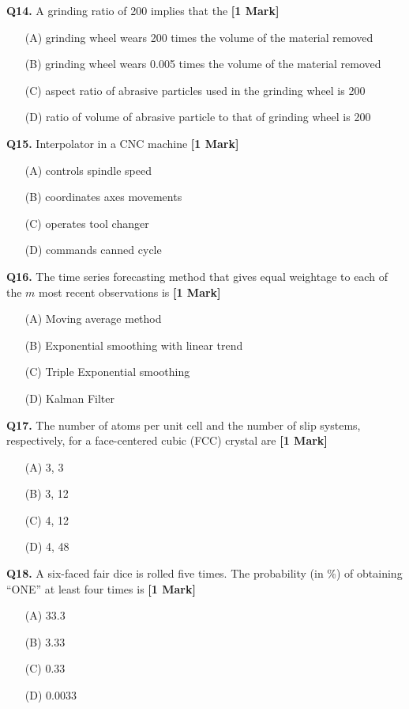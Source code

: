 \documentclass[11pt]{article}
\newcommand{\questiona}[2]{
    \noindent\textbf{Q#2.} #1 \hfill \textbf{[1 Mark]}
}
\begin{document}
\questiona{A grinding ratio of 200 implies that the}{14}
\begin{enumerate}
    \item[(A)] grinding wheel wears 200 times the volume of the material removed
    \item[(B)] grinding wheel wears 0.005 times the volume of the material removed
    \item[(C)] aspect ratio of abrasive particles used in the grinding wheel is 200
    \item[(D)] ratio of volume of abrasive particle to that of grinding wheel is 200
\end{enumerate}
\vspace{0.5cm}

\questiona{Interpolator in a CNC machine}{15}
\begin{enumerate}
    \item[(A)] controls spindle speed
    \item[(B)] coordinates axes movements
    \item[(C)] operates tool changer
    \item[(D)] commands canned cycle
\end{enumerate}
\vspace{0.5cm}

\questiona{The time series forecasting method that gives equal weightage to each of the \( m \) most recent observations is}{16}
\begin{enumerate}
    \item[(A)] Moving average method
    \item[(B)] Exponential smoothing with linear trend
    \item[(C)] Triple Exponential smoothing
    \item[(D)] Kalman Filter
\end{enumerate}
\vspace{0.5cm}

\questiona{The number of atoms per unit cell and the number of slip systems, respectively, for a face-centered cubic (FCC) crystal are}{17}
\begin{enumerate}
    \item[(A)] 3, 3
    \item[(B)] 3, 12
    \item[(C)] 4, 12
    \item[(D)] 4, 48
\end{enumerate}
\vspace{0.5cm}

\questiona{A six-faced fair dice is rolled five times. The probability (in \%) of obtaining “ONE” at least four times is}{18}
\begin{enumerate}
    \item[(A)] 33.3
    \item[(B)] 3.33
    \item[(C)] 0.33
    \item[(D)] 0.0033
\end{enumerate}
\vspace{0.5cm}
\end{document}

